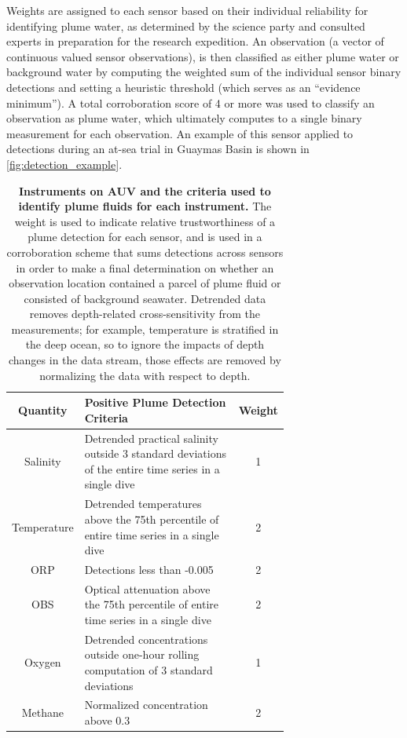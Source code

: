 Weights are assigned to each sensor based on their individual reliability for identifying plume water, as determined by the science party and consulted experts in preparation for the research expedition. An observation (a vector of continuous valued sensor observations), is then classified as either plume water or background water by computing the weighted sum of the individual sensor binary detections and setting a heuristic threshold (which serves as an ``evidence minimum''). A total corroboration score of 4 or more was used to classify an observation as plume water, which ultimately computes to a single binary measurement for each observation. An example of this sensor applied to \Sentry detections during an at-sea trial in Guaymas Basin is shown in \cref{fig:detection_example}.

\begin{table}[h!]
    \centering
    \begin{tabular}{c|p{0.7\linewidth}|c}
        Quantity & Positive Plume Detection Criteria & Weight  \\
        \hline
        Salinity & Detrended practical salinity outside 3 standard deviations of the entire time series in a single dive & 1 \\
        \hline
        Temperature & Detrended temperatures above the 75th percentile of entire time series in a single dive & 2 \\
        \hline
        ORP & Detections less than -0.005 & 2 \\
        \hline
        OBS & Optical attenuation above the 75th percentile of entire time series in a single dive & 2 \\
        \hline
        Oxygen & Detrended concentrations outside one-hour rolling computation of 3 standard deviations & 1 \\
        \hline
        Methane & Normalized concentration above 0.3 & 2
    \end{tabular}
    \caption[Instruments on AUV \Sentry and the criteria used to identify plume fluids for each instrument.]{\textbf{Instruments on AUV \Sentry and the criteria used to identify plume fluids for each instrument.} The weight is used to indicate relative trustworthiness of a plume detection for each sensor, and is used in a corroboration scheme that sums detections across sensors in order to make a final determination on whether an observation location contained a parcel of plume fluid or consisted of background seawater. Detrended data removes depth-related cross-sensitivity from the measurements; for example, temperature is stratified in the deep ocean, so to ignore the impacts of depth changes in the data stream, those effects are removed by normalizing the data with respect to depth.}
    \label{tab:sentry_instruments}
\end{table}

